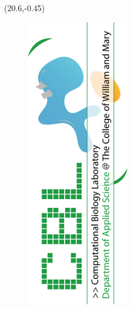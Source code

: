 \documentclass[a0]{a0poster}
\def\LHead#1{\noindent{\LARGE\color{black} #1}\medskip}
\begin{document}
\begin{textblock}{23}(20.6,-0.45)
\begin{figure}
\includegraphics[height=5in, angle = 270]{pics/logo}
\end{figure}
\end{textblock}

%



\end{document}
